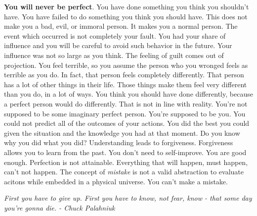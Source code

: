 \documentclass[a4paper,hidelinks]{article}
\begin{document}
\textbf{You will never be perfect}.
You have done something you think you shouldn't have.
You have failed to do something you think you should have.
This does not make you a bad, evil, or immoral person.
It makes you a normal person.
The event which occurred is not completely your fault.
You had your share of influence and you will be careful to avoid such behavior in the future.
Your influence was not so large as you think.
The feeling of guilt comes out of projection.
You feel terrible, so you assume the person who you wronged feels as terrible as you do.
In fact, that person feels completely differently.
That person has a lot of other things in their life.
Those things make them feel very different than you do, in a lot of ways.
You think you should have done differently, because a perfect person would do differently.
That is not in line with reality.
You're not supposed to be some imaginary perfect person.
You're supposed to be you.
You could not predict all of the outcomes of your actions.
You did the best you could given the situation and the knowledge you had at that moment.
Do you know why you did what you did?
Understanding leads to forgiveness.
Forgiveness allows you to learn from the past.
You don't need to self-improve.
You are good enough.
Perfection is not attainable.
Everything that will happen, must happen, can't not happen.
The concept of \textit{mistake} is not a valid abstraction to evaluate acitons while embedded in a physical universe.
You can't make a mistake.

\newpage

\begin{center}
\textit{
First you have to give up. First you have to know, not fear, know - that some day you’re gonna die. - Chuck Palahniuk
}
\end{center}
\end{document}
